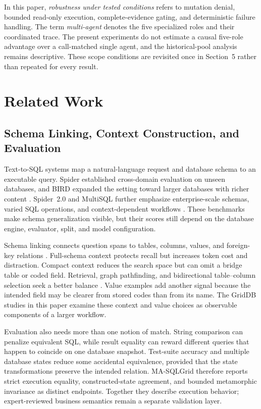 \documentclass[applsci,article,submit,moreauthors]{Definitions/mdpi}
\newcommand{\masql}{MA-SQLGrid}
\begin{document}
In this paper, \emph{robustness under tested conditions} refers to mutation denial, bounded read-only execution, complete-evidence gating, and deterministic failure handling. The term \emph{multi-agent} denotes the five specialized roles and their coordinated trace. The present experiments do not estimate a causal five-role advantage over a call-matched single agent, and the historical-pool analysis remains descriptive. These scope conditions are revisited once in Section~5 rather than repeated for every result.

\section{Related Work}

\subsection{Schema Linking, Context Construction, and Evaluation}

Text-to-SQL systems map a natural-language request and database schema to an executable query. Spider established cross-domain evaluation on unseen databases, and BIRD expanded the setting toward larger databases with richer content \cite{yu2018spider,li2023bird}. Spider~2.0 and MultiSQL further emphasize enterprise-scale schemas, varied SQL operations, and context-dependent workflows \cite{lei2025spider2,li2024multisql}. These benchmarks make schema generalization visible, but their scores still depend on the database engine, evaluator, split, and model configuration.

Schema linking connects question spans to tables, columns, values, and foreign-key relations \cite{wang2020ratsql,lei2020reexamining,liu2022semantic}. Full-schema context protects recall but increases token cost and distraction. Compact context reduces the search space but can omit a bridge table or coded field. Retrieval, graph pathfinding, and bidirectional table--column selection seek a better balance \cite{bozdemir2026schema,liu2025solidsql,hao2025genlink,wang2025linkalign,safdarian2026schemagraphsql,nahid2026bidirectional}. Value examples add another signal because the intended field may be clearer from stored codes than from its name. The GridDB studies in this paper examine these context and value choices as observable components of a larger workflow.

Evaluation also needs more than one notion of match. String comparison can penalize equivalent SQL, while result equality can reward different queries that happen to coincide on one database snapshot. Test-suite accuracy and multiple database states reduce some accidental equivalence, provided that the state transformations preserve the intended relation. \masql{} therefore reports strict execution equality, constructed-state agreement, and bounded metamorphic invariance as distinct endpoints. Together they describe execution behavior; expert-reviewed business semantics remain a separate validation layer.
\end{document}
